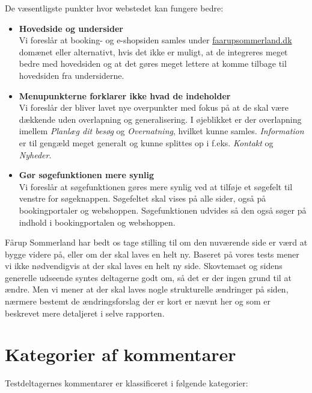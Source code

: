 \documentclass[10pt,a4paper]{article}      %
\begin{document}
\noindent De væsentligste punkter hvor webstedet kan fungere bedre:
\begin{itemize}
    \item \textbf{Hovedside og undersider}\\
        Vi foreslår at booking- og e-shopsiden samles under \url{faarupsommerland.dk} domænet
        eller alternativt, hvis det ikke er muligt, at de integreres meget bedre
        med hovedsiden og at det gøres meget lettere at komme tilbage til
        hovedsiden fra undersiderne.

    \item \textbf{Menupunkterne forklarer ikke hvad de indeholder}\\
        Vi foreslår der bliver lavet nye overpunkter med fokus på at de skal være dækkende
        uden overlapning og generalisering. I øjeblikket er der overlapning imellem
        \emph{Planlæg dit besøg} og \emph{Overnatning}, hvilket kunne samles.
        \emph{Information} er til gengæld meget generalt og kunne splittes op i f.eks.
        \emph{Kontakt} og \emph{Nyheder}.

    \item \textbf{Gør søgefunktionen mere synlig}\\
        Vi foreslår at søgefunktionen gøres mere synlig ved at tilføje et
        søgefelt til venstre for søgeknappen. Søgefeltet skal vises på alle
        sider, også på bookingportaler og webshoppen. Søgefunktionen udvides så
        den også søger på indhold i bookingportalen og webshoppen.
\end{itemize}
Fårup Sommerland har bedt os tage stilling til om den nuværende side
er værd at bygge videre på, eller om der skal laves en helt ny.
Baseret på vores tests mener vi ikke nødvendigvis at der skal laves en helt ny
side. Skovtemaet og sidens generelle udseende syntes deltagerne godt om, så det
er der ingen grund til at ændre. Men vi mener at der skal laves nogle
strukturelle ændringer på siden, nærmere bestemt de ændringsforslag der er kort er
nævnt her og som er beskrevet mere detaljeret i selve rapporten.

\clearpage

\tableofcontents
\clearpage


\section{Kategorier af kommentarer}
Testdeltagernes kommentarer er klassificeret i følgende kategorier:
\end{document}
